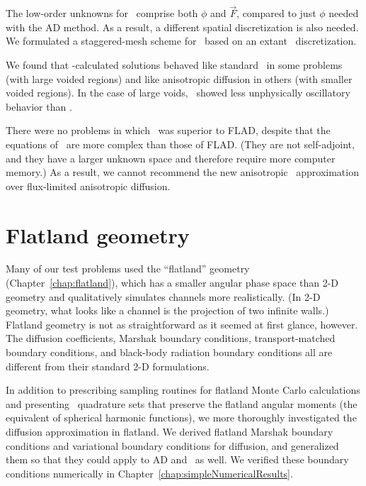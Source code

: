 The low-order unknowns for \APone\ comprise both $\phi$ and $\vec{F}$, compared
to just $\phi$ needed with the AD method.  As a result, a different spatial
discretization is also needed. We formulated a staggered-mesh
scheme for \APone\ based on an extant \Pone\ discretization.

We found that \APone-calculated solutions behaved like standard \Pone\ in some
problems (with large voided regions) and like anisotropic diffusion in others
(with smaller voided regions). In the case of large voids, \APone\ showed less
unphysically oscillatory behavior than \Pone.

There were no problems in which \APone\ was superior to FLAD,
despite that the equations of \APone\ are more complex than those of FLAD. (They
are not
self-adjoint, and they have a larger unknown space and therefore require more
computer memory.)
As a result, we cannot recommend the new anisotropic \Pone\ approximation over
flux-limited anisotropic diffusion.

\section{Flatland geometry}

Many of our test problems used the ``flatland'' geometry
(Chapter~\ref{chap:flatland}), which has a smaller angular phase space than 2-D
geometry and qualitatively simulates channels more realistically. (In 2-D
geometry, what looks like a channel is the projection of two infinite walls.)
Flatland geometry is not as straightforward as it seemed at first glance,
however. The diffusion coefficients, Marshak boundary conditions,
transport-matched boundary conditions, and black-body radiation boundary
conditions all are different from their standard 2-D formulations.

In addition to prescribing sampling routines for flatland Monte Carlo
calculations and presenting \SN\ quadrature sets that preserve the flatland
angular moments (the equivalent of spherical harmonic functions), we more
thoroughly investigated the diffusion approximation in flatland. We derived
flatland Marshak boundary conditions and variational boundary conditions for
diffusion, and generalized them so that they could apply to AD and \APone\ as
well. We verified these boundary conditions numerically in
Chapter~\ref{chap:simpleNumericalResults}.

